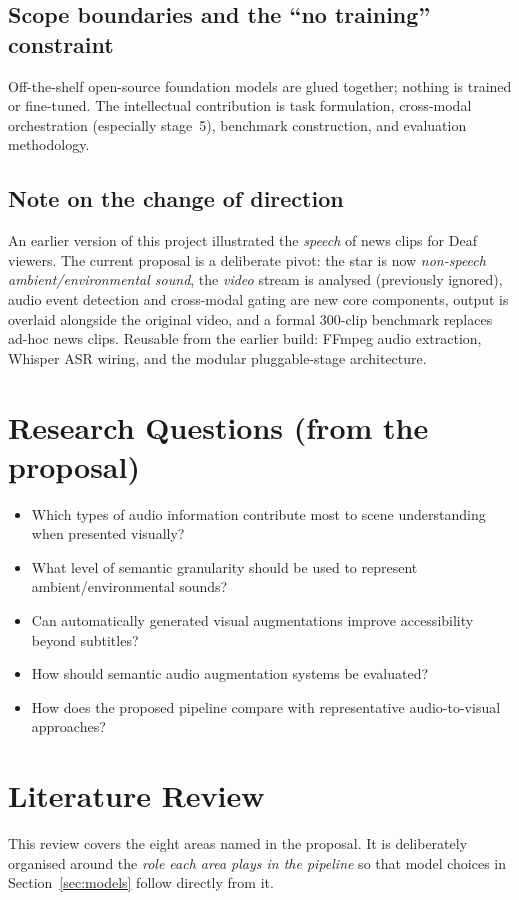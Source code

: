 \documentclass[11pt,a4paper]{article}
\begin{document}
\subsection{Scope boundaries and the ``no training'' constraint}
Off-the-shelf open-source foundation models are glued together; nothing is trained or fine-tuned.
The intellectual contribution is task formulation, cross-modal orchestration (especially stage~5),
benchmark construction, and evaluation methodology.

\subsection{Note on the change of direction}
An earlier version of this project illustrated the \emph{speech} of news clips for Deaf viewers.
The current proposal is a deliberate pivot: the star is now \emph{non-speech ambient/environmental
sound}, the \emph{video} stream is analysed (previously ignored), audio event detection and
cross-modal gating are new core components, output is overlaid alongside the original video, and a
formal 300-clip benchmark replaces ad-hoc news clips. Reusable from the earlier build: FFmpeg audio
extraction, Whisper ASR wiring, and the modular pluggable-stage architecture.

\section{Research Questions (from the proposal)}
\begin{itemize}
  \item Which types of audio information contribute most to scene understanding when presented visually?
  \item What level of semantic granularity should be used to represent ambient/environmental sounds?
  \item Can automatically generated visual augmentations improve accessibility beyond subtitles?
  \item How should semantic audio augmentation systems be evaluated?
  \item How does the proposed pipeline compare with representative audio-to-visual approaches?
\end{itemize}

\section{Literature Review}\label{sec:litreview}
This review covers the eight areas named in the proposal. It is deliberately organised around the
\emph{role each area plays in the pipeline} so that model choices in Section~\ref{sec:models}
follow directly from it.
\end{document}
